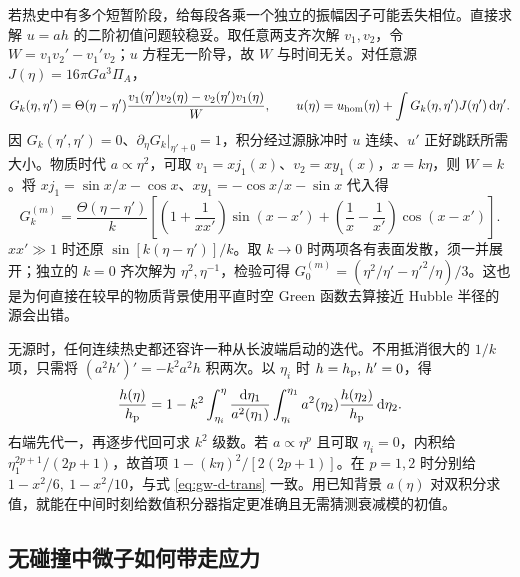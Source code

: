 若热史中有多个短暂阶段，给每段各乘一个独立的振幅因子可能丢失相位。直接求解 $u=ah$ 的二阶初值问题较稳妥。取任意两支齐次解 $v_1,v_2$，令 $W=v_1v_2'-v_1'v_2$；$u$ 方程无一阶导，故 $W$ 与时间无关。对任意源 $J(\eta)=16\pi G a^3\Pi_A$，
\[
 G_k(\eta,\eta')=\Theta(\eta-\eta')
 \frac{v_1(\eta')v_2(\eta)-v_2(\eta')v_1(\eta)}{W},
 \qquad u(\eta)=u_{\rm hom}(\eta)+\int G_k(\eta,\eta')J(\eta')\,\mathrm d\eta' .
\]
因 $G_k(\eta',\eta')=0$、$\partial_\eta G_k|_{\eta'+0}=1$，积分经过源脉冲时 $u$ 连续、$u'$ 正好跳跃所需大小。物质时代 $a\propto\eta^2$，可取 $v_1=xj_1(x)$、$v_2=xy_1(x)$，$x=k\eta$，则 $W=k$。将 $xj_1=\sin x/x-\cos x$、$xy_1=-\cos x/x-\sin x$ 代入得
\[
 G_k^{(m)}=\frac{\Theta(\eta-\eta')}{k}
 \left[\left(1+\frac1{xx'}\right)\sin(x-x')
       +\left(\frac1x-\frac1{x'}\right)\cos(x-x')\right].
\]
$xx'\gg1$ 时还原 $\sin[k(\eta-\eta')]/k$。取 $k\to0$ 时两项各有表面发散，须一并展开；独立的 $k=0$ 齐次解为 $\eta^2,\eta^{-1}$，检验可得 $G_0^{(m)}=(\eta^2/\eta'-\eta'^2/\eta)/3$。这也是为何直接在较早的物质背景使用平直时空 Green 函数去算接近 Hubble 半径的源会出错。

无源时，任何连续热史都还容许一种从长波端启动的迭代。不用抵消很大的 $1/k$ 项，只需将 $(a^2h')'=-k^2a^2h$ 积两次。以 $\eta_i$ 时 $h=h_{\rm p},\,h'=0$，得
\[
 \frac{h(\eta)}{h_{\rm p}}=1-k^2\int_{\eta_i}^\eta
 \frac{\mathrm d\eta_1}{a^2(\eta_1)}
 \int_{\eta_i}^{\eta_1}a^2(\eta_2)\frac{h(\eta_2)}{h_{\rm p}}\,\mathrm d\eta_2 .
\]
右端先代一，再逐步代回可求 $k^2$ 级数。若 $a\propto\eta^p$ 且可取 $\eta_i=0$，内积给 $\eta_1^{2p+1}/(2p+1)$，故首项 $1-(k\eta)^2/[2(2p+1)]$。在 $p=1,2$ 时分别给 $1-x^2/6,\ 1-x^2/10$，与式 \eqref{eq:gw-d-trans} 一致。用已知背景 $a(\eta)$ 对双积分求值，就能在中间时刻给数值积分器指定更准确且无需猜测衰减模的初值。
\subsection{无碰撞中微子如何带走应力}

